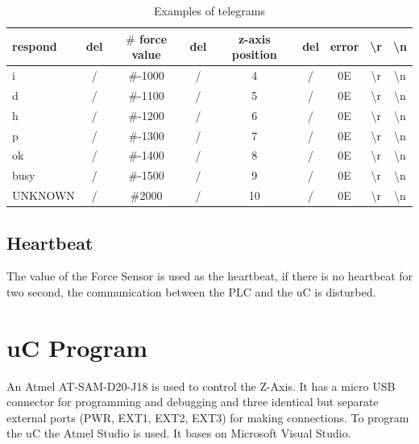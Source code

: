 \documentclass[a4paper,12pt]{scrreprt}
\begin{document}
\begin{table}[H]
\centering
\begin{tabular}{|l|c|c|c|c|c|c|c|c|}
\hline 
 respond &  \acs{del} &  $\#$ force value &  \acs{del} &  z-axis position &  \acs{del} &  error & \textbackslash r & \textbackslash n\\ 
 \hline 
 \acs{i} &  / &  $\#$-1000 &  / &  4 & /  &  0E &  \textbackslash r & \textbackslash n \\ 
 \hline 
 \acs{d} &  / & $\#$-1100 &  / &  5 &  / &  0E &   \textbackslash r & \textbackslash n \\ 
 \hline 
 \acs{h} &  / &  $\#$-1200 & / & 6 &  / &  0E &   \textbackslash r & \textbackslash n \\ 
 \hline 
 \acs{p} & / &  $\#$-1300 &  / & 7 &  / &  0E &  \textbackslash r & \textbackslash n \\ 
 \hline 
 \acs{ok} &  / &  $\#$-1400 &  / &  8 &  / &  0E &  \textbackslash r & \textbackslash n \\ 
 \hline 
 \acs{busy} &  / &  $\#$-1500 &  / &  9 &  / &  0E &  \textbackslash r & \textbackslash n \\ 
 \hline 
 \acs{UNKNOWN} &  / &  $\#$2000 &  / &  10 &  / &  0E &   \textbackslash r & \textbackslash n \\
\hline 
\end{tabular} 
\caption{Examples of telegrams}
\label{tab: telegram examples}
\end{table}

\section{Heartbeat}

The value of the Force Sensor is used as the heartbeat, if there is no heartbeat for two second, the communication between the \ac{PLC} and the \ac{uC} is disturbed.

\chapter{\acs{uC} Program}

An Atmel AT-SAM-D20-J18 is used to control the Z-Axis. It has a micro USB connector for programming and debugging and three identical but separate external ports (PWR, EXT1, EXT2, EXT3) for making connections. To program the \acs{uC} the Atmel Studio is used. It bases on Microsoft Visual Studio.
\end{document}
